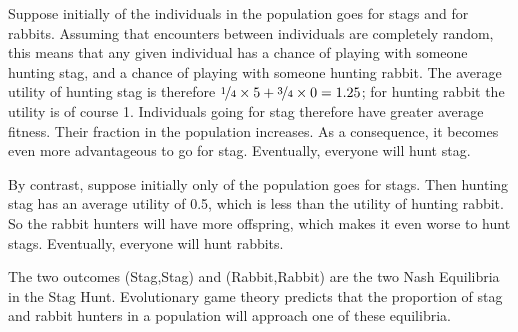 Suppose initially  of the individuals in the population
goes for stags and  for rabbits. Assuming that
encounters between individuals are completely random, this means that
any given individual has a  chance of playing with
someone hunting stag, and a  chance of playing with
someone hunting rabbit. The average utility of hunting stag is
therefore $\nicefrac{1}{4} \times 5 + \nicefrac{3}{4} \times 0 = 1.25$;
for hunting rabbit the utility is of course 1. Individuals going for
stag therefore have greater average fitness. Their fraction in the
population increases. As a consequence, it becomes even more
advantageous to go for stag. Eventually, everyone will hunt stag.

By contrast, suppose initially only  of the population
goes for stags. Then hunting stag has an average utility of 0.5, which
is less than the utility of hunting rabbit. So the rabbit hunters will
have more offspring, which makes it even worse to hunt
stags. Eventually, everyone will hunt rabbits.

The two outcomes (Stag,Stag) and (Rabbit,Rabbit) are the two Nash
Equilibria in the Stag Hunt. Evolutionary game theory predicts that
the proportion of stag and rabbit hunters in a population will
approach one of these equilibria. 



